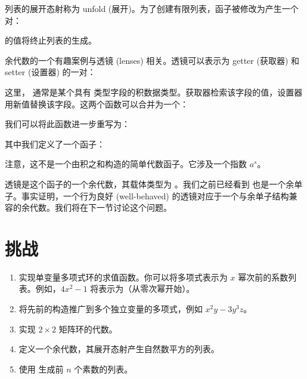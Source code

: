 列表的展开态射称为 unfold (展开)。为了创建有限列表，函子被修改为产生一个  对：

 的值将终止列表的生成。

余代数的一个有趣案例与透镜 (lenses) 相关。透镜可以表示为 getter (获取器) 和 setter (设置器) 的一对：

这里， 通常是某个具有  类型字段的积数据类型。获取器检索该字段的值，设置器用新值替换该字段。这两个函数可以合并为一个：

我们可以将此函数进一步重写为：

其中我们定义了一个函子：

注意，这不是一个由积之和构造的简单代数函子。它涉及一个指数 $a^s$。

透镜是这个函子的一个余代数，其载体类型为 。我们之前已经看到  也是一个余单子。事实证明，一个行为良好 (well-behaved) 的透镜对应于一个与余单子结构兼容的余代数。我们将在下一节讨论这个问题。

\section{挑战}

\begin{enumerate}
  \tightlist
  \item
        实现单变量多项式环的求值函数。你可以将多项式表示为 $x$ 幂次前的系数列表。例如，$4x^2-1$ 将表示为（从零次幂开始）\code{{[}-1, 0, 4{]}}。
  \item
        将先前的构造推广到多个独立变量的多项式，例如 $x^2y-3y^3z$。
  \item
        实现 $2\times{}2$ 矩阵环的代数。
  \item
        定义一个余代数，其展开态射产生自然数平方的列表。
  \item
        使用  生成前 $n$ 个素数的列表。
\end{enumerate}